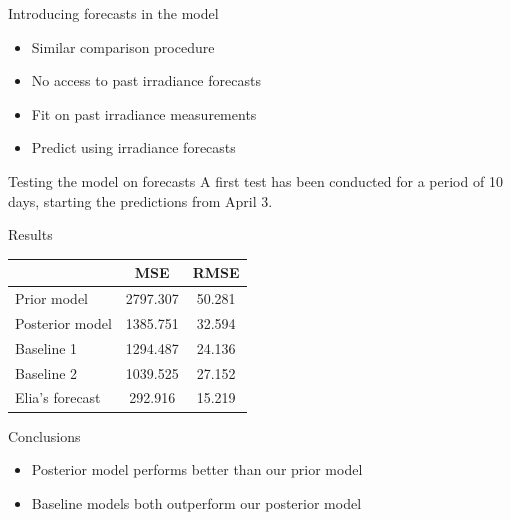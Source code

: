 \documentclass[12pt]{beamer}
\begin{document}
\begin{frame}{Introducing forecasts in the model}
    \begin{itemize}
        \item \alert{Similar} comparison procedure
        \item \alert{No access} to past irradiance forecasts
        \item Fit on \alert{past} irradiance measurements
        \item Predict using irradiance \alert{forecasts}
    \end{itemize}
\end{frame}

\begin{frame}{Testing the model on forecasts}
    A first test has been conducted for a period of \alert{10 days}, starting the predictions from \alert{April 3}.
\end{frame}

\begin{frame}{Results}
    \begin{table}
	\centering
    \begin{tabular}{l|c|c}
                        & MSE      & RMSE   \\ \hline
        Prior model     & 2797.307  & 50.281 \\ \hline
        Posterior model & 1385.751  & 32.594 \\ \hline
        Baseline 1      & 1294.487 & 24.136 \\ \hline
        Baseline 2      & 1039.525 & 27.152 \\ \hline
        Elia's forecast & 292.916  & 15.219
    \end{tabular}
    \label{tab:pv_metrics_for}
\end{table}
\end{frame}

\begin{frame}{Conclusions}
    \begin{itemize}
        \item \alert{Posterior} model performs \alert{better} than our prior model
        \item \alert{Baseline} models both \alert{outperform} our posterior model
    \end{itemize}
\end{frame}
\end{document}
